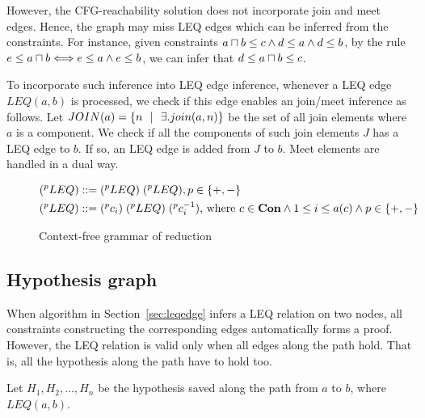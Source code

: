 However, the CFG-reachability solution does not incorporate join and meet
edges. Hence, the graph may miss LEQ edges which can be inferred from the
constraints. For instance,  given constraints $a\sqcap b \leq c\land d\leq a
\land d\leq b$, by the rule $e\leq a\sqcap b \Longleftrightarrow e\leq a\land e\leq b$, we can
infer that $d\leq a\sqcap b \leq c$. 

To incorporate such inference into LEQ edge inference, whenever a LEQ edge
$LEQ(a,b)$ is processed, we check if this edge enables an join/meet inference
as follows. Let $JOIN(a)=\{n \ \ | \ \  \exists. join(a,n) \}$ be the set of all join
elements where $a$ is a component. We check if all the components of such join
elements $J$ has a LEQ edge to $b$. If so, an LEQ edge is added from $J$ to
$b$. Meet elements are handled in a dual way.

\begin{figure}
\hfil
\begin{minipage}{2.3in}
\begin{align*}
(^{p}LEQ) ::=\; & (^{p}LEQ)\; (^{p}LEQ), p\in \{+,-\} \\
(^{p}LEQ) ::=\; & (^{p}c_i)\; (^{p}LEQ)\; (^{p}c_i^{-1}) \text{, where }  
    c\in \mathbf{Con} \land 1 \leq i\leq a(c) \land p\in \{+,-\}\\
\end{align*}
\end{minipage}
\caption{Context-free grammar of reduction}
\label{figure:cfg}
\end{figure}

% 
\subsection{Hypothesis graph}
\label{sec:hypograph}

When algorithm in Section~\ref{sec:leqedge} infers a LEQ relation on two nodes,
all constraints constructing the corresponding edges automatically forms a
proof. However, the LEQ relation is valid only when all edges along the path
hold. That is, all the hypothesis along the path have to hold too.

Let $H_1, H_2, \dots, H_n$ be the hypothesis saved along the path from $a$ to
$b$, where $LEQ(a,b)$. 

